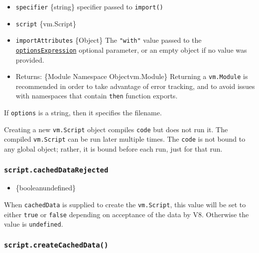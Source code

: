 \begin{itemize}
\begin{itemize}
    \begin{itemize}
    \tightlist
    \item
      \texttt{specifier} \{string\} specifier passed to
      \texttt{import()}
    \item
      \texttt{script} \{vm.Script\}
    \item
      \texttt{importAttributes} \{Object\} The \texttt{"with"} value
      passed to the
      \href{https://tc39.es/proposal-import-attributes/\#sec-evaluate-import-call}{\texttt{optionsExpression}}
      optional parameter, or an empty object if no value was provided.
    \item
      Returns: \{Module Namespace Object\textbar vm.Module\} Returning a
      \texttt{vm.Module} is recommended in order to take advantage of
      error tracking, and to avoid issues with namespaces that contain
      \texttt{then} function exports.
    \end{itemize}
  \end{itemize}
\end{itemize}

If \texttt{options} is a string, then it specifies the filename.

Creating a new \texttt{vm.Script} object compiles \texttt{code} but does
not run it. The compiled \texttt{vm.Script} can be run later multiple
times. The \texttt{code} is not bound to any global object; rather, it
is bound before each run, just for that run.

\subsubsection{\texorpdfstring{\texttt{script.cachedDataRejected}}{script.cachedDataRejected}}\label{script.cacheddatarejected}

\begin{itemize}
\tightlist
\item
  \{boolean\textbar undefined\}
\end{itemize}

When \texttt{cachedData} is supplied to create the \texttt{vm.Script},
this value will be set to either \texttt{true} or \texttt{false}
depending on acceptance of the data by V8. Otherwise the value is
\texttt{undefined}.

\subsubsection{\texorpdfstring{\texttt{script.createCachedData()}}{script.createCachedData()}}\label{script.createcacheddata}

